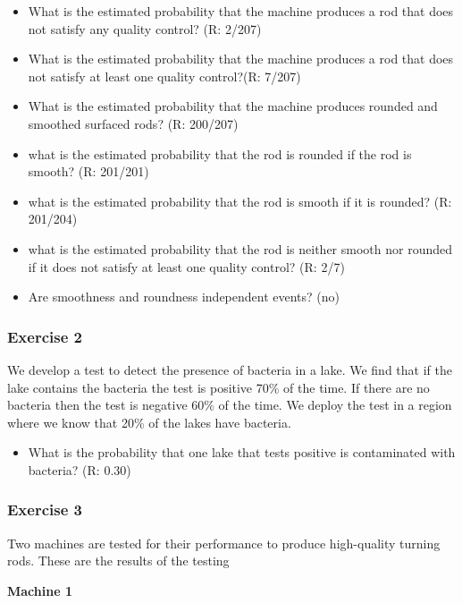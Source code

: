 \documentclass[
]{book}
\providecommand{\tightlist}{%
  \setlength{\itemsep}{0pt}\setlength{\parskip}{0pt}}
\begin{document}
\begin{itemize}
\item
  What is the estimated probability that the machine produces a rod that does not satisfy any quality control? (R: 2/207)
\item
  What is the estimated probability that the machine produces a rod that does not satisfy at least one quality control?(R: 7/207)
\item
  What is the estimated probability that the machine produces rounded and smoothed surfaced rods? (R: 200/207)
\item
  what is the estimated probability that the rod is rounded if the rod is smooth? (R: 201/201)
\item
  what is the estimated probability that the rod is smooth if it is rounded? (R: 201/204)
\item
  what is the estimated probability that the rod is neither smooth nor rounded if it does not satisfy at least one quality control? (R: 2/7)
\item
  Are smoothness and roundness independent events? (no)
\end{itemize}

\hypertarget{exercise-2-2}{%
\subsubsection{Exercise 2}\label{exercise-2-2}}

We develop a test to detect the presence of bacteria in a lake. We find that if the lake contains the bacteria the test is positive 70\% of the time. If there are no bacteria then the test is negative 60\% of the time. We deploy the test in a region where we know that 20\% of the lakes have bacteria.

\begin{itemize}
\tightlist
\item
  What is the probability that one lake that tests positive is contaminated with bacteria? (R: 0.30)
\end{itemize}

\hypertarget{exercise-3}{%
\subsubsection{Exercise 3}\label{exercise-3}}

Two machines are tested for their performance to produce high-quality turning rods. These are the results of the testing

\textbf{Machine 1}
\end{document}
